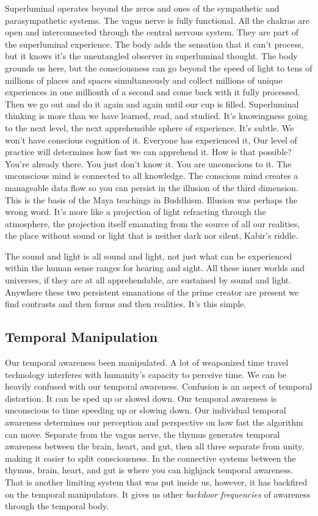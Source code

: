 Superluminal operates beyond the zeros and ones of the sympathetic and
parasympathetic systems. The vagus nerve is fully functional. All the
chakras are open and interconnected through the central nervous system.
They are part of the superluminal experience. The body adds the
sensation that it can't process, but it knows it's the unentangled
observer in superluminal thought. The body grounds us here, but the
consciousness can go beyond the speed of light to tens of millions of
places and spaces simultaneously and collect millions of unique
experiences in one millionth of a second and come back with it fully
processed. Then we go out and do it again and again until our cup is
filled. Superluminal thinking is more than we have learned, read, and
studied. It's knowingness going to the next level, the next
apprehensible sphere of experience. It's subtle. We won't have conscious
cognition of it. Everyone has experienced it, Our level of practice will
determines how fast we can apprehend it. How is that possible? You're
already there. You just don't know it. You are unconscious to it. The
unconscious mind is connected to all knowledge. The conscious mind
creates a manageable data flow so you can persist in the illusion of the
third dimension. This is the basis of the Maya teachings in Buddhism.
Illusion was perhaps the wrong word. It's more like a projection of
light refracting through the atmosphere, the projection itself emanating
from the source of all our realities, the place without sound or light
that is neither dark nor silent, Kabir's riddle.

The sound and light is all sound and light, not just what can be
experienced within the human sense ranges for hearing and sight. All
these inner worlds and universes, if they are at all apprehendable, are
sustained by sound and light. Anywhere these two persistent emanations
of the prime creator are present we find contrasts and then forms and
then realities. It's this simple.

\subsection{Temporal Manipulation}\label{temporal-manipulation}

Our temporal awareness been manipulated. A lot of weaponized time travel
technology interferes with humanity's capacity to perceive time. We can
be heavily confused with our temporal awareness. Confusion is an aspect
of temporal distortion. It can be sped up or slowed down. Our temporal
awareness is unconscious to time speeding up or slowing down. Our
individual temporal awareness determines our perception and perspective
on how fast the algorithm can move. Separate from the vagus nerve, the
thymus generates temporal awareness between the brain, heart, and gut,
then all three separate from unity, making it easier to split
consciousness. In the connective systems between the thymus, brain,
heart, and gut is where you can highjack temporal awareness. That is
another limiting system that was put inside us, however, it has
backfired on the temporal manipulators. It gives us other \emph{backdoor
frequencies} of awareness through the temporal body.

